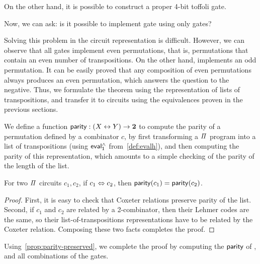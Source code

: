 \noindent
On the other hand, it is possible to construct a proper 4-bit toffoli gate.
\medskip
\toffoli{}
\vspace{-0.5em}

\noindent
Now, we can ask: is it possible to implement  gate using only  gates?
\medskip

Solving this problem in the circuit representation is difficult. However, we can observe that all  gates
implement even permutations, that is, permutations that contain an even number of transpositions. On the other hand,
 implements an odd permutation. It can be easily proved that any composition of even permutations always
produces an even permutation, which answers the question to the negative. Thus, we formulate the theorem using the
representation of lists of transpositions, and transfer it to circuits using the equivalences proven in the previous
sections.

We define a function $\operatorname{\mathsf{parity}} : (X \mathrel{\leftrightarrow} Y) \to {\mathbf{2}}$ to compute the parity of a permutation defined by a combinator
$c$, by first transforming a $\mathit{\Pi}$ program into a list of transpositions (using $\evalh_{1}$ from~\cref{def:evalh}),
and then computing the parity of this representation, which amounts to a simple checking of the parity of the length of
the list.

\begin{propositionrep}
  \label{prop:parity-preserved}
  For two $\mathit{\Pi}$ circuits $c_1, c_2$, if $c_1 \mathrel{\Leftrightarrow} c_2$, then $\operatorname{\mathsf{parity}}(c_1) = \operatorname{\mathsf{parity}}(c_2)$.
\end{propositionrep}
\begin{proof}
  First, it is easy to check that Coxeter relations preserve parity of the list. Second, if $c_1$ and $c_2$ are related
  by a 2-combinator, then their Lehmer codes are the same, so their list-of-transpositions representations have to be
  related by the Coxeter relation. Composing these two facts completes the proof.
\end{proof}

\noindent
Using~\cref{prop:parity-preserved}, we complete the proof by computing the $\operatorname{\mathsf{parity}}$ of , and all
combinations of the  gates.


